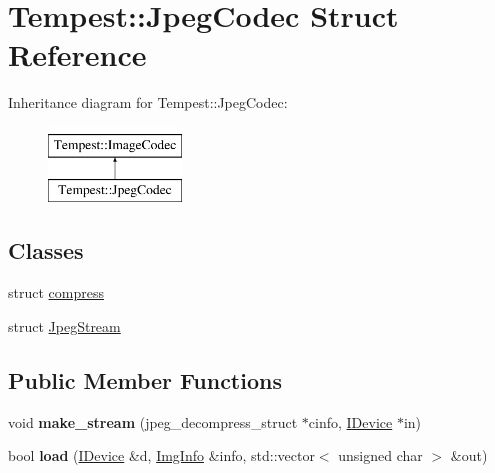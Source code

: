 \hypertarget{struct_tempest_1_1_jpeg_codec}{\section{Tempest\+:\+:Jpeg\+Codec Struct Reference}
\label{struct_tempest_1_1_jpeg_codec}
}
Inheritance diagram for Tempest\+:\+:Jpeg\+Codec\+:\begin{figure}[H]
\begin{center}
\leavevmode
\includegraphics[height=2.000000cm]{struct_tempest_1_1_jpeg_codec}
\end{center}
\end{figure}
\subsection*{Classes}
\begin{DoxyCompactItemize}
\item 
struct \hyperlink{struct_tempest_1_1_jpeg_codec_1_1compress}{compress}
\item 
struct \hyperlink{struct_tempest_1_1_jpeg_codec_1_1_jpeg_stream}{Jpeg\+Stream}
\end{DoxyCompactItemize}
\subsection*{Public Member Functions}
\begin{DoxyCompactItemize}
\item 
\hypertarget{struct_tempest_1_1_jpeg_codec_a58a803d04ebdfae1f9ffaa6878e440ff}{void {\bfseries make\+\_\+stream} (jpeg\+\_\+decompress\+\_\+struct $\ast$cinfo, \hyperlink{class_tempest_1_1_i_device}{I\+Device} $\ast$in)}\label{struct_tempest_1_1_jpeg_codec_a58a803d04ebdfae1f9ffaa6878e440ff}

\item 
\hypertarget{struct_tempest_1_1_jpeg_codec_a4fe73b181a7a014c2999d8394571bcb8}{bool {\bfseries load} (\hyperlink{class_tempest_1_1_i_device}{I\+Device} \&d, \hyperlink{struct_tempest_1_1_pixmap_1_1_img_info}{Img\+Info} \&info, std\+::vector$<$ unsigned char $>$ \&out)}\label{struct_tempest_1_1_jpeg_codec_a4fe73b181a7a014c2999d8394571bcb8}

\end{DoxyCompactItemize}
